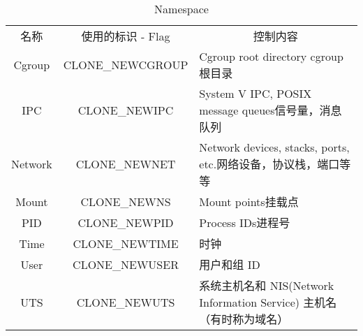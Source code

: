 \documentclass[../../../interview-questions.tex]{subfiles}
\begin{document}
\begin{table}[htbp]
	\caption{Namespace}
	\label{table:namespace}
	\begin{center}
		\begin{tabular}{ccp{5cm}}
			\hline
			\multirow{1}{*}{名称}
			& \multicolumn{1}{c}{使用的标识 - Flag} 
			& \multicolumn{1}{c}{控制内容}\\			
			\cline{1-3}
			Cgroup & CLONE\_NEWCGROUP  &  Cgroup root directory cgroup 根目录            \\
			\hline
			IPC & CLONE\_NEWIPC	 & System V IPC, POSIX message queues信号量，消息队列 \\
			\hline
			Network & CLONE\_NEWNET & Network devices, stacks, ports, etc.网络设备，协议栈，端口等等 \\
			\hline
            Mount &  CLONE\_NEWNS & Mount points挂载点            \\
			\hline
            PID &  CLONE\_NEWPID	 & Process IDs进程号            \\
			\hline
            Time &  CLONE\_NEWTIME & 时钟            \\
			\hline
            User &  CLONE\_NEWUSER	 & 用户和组 ID            \\
			\hline
            UTS &  CLONE\_NEWUTS	 & 系统主机名和 NIS(Network Information Service) 主机名（有时称为域名）            \\
			\hline							
		\end{tabular}	
	\end{center}
\end{table}
\end{document}
